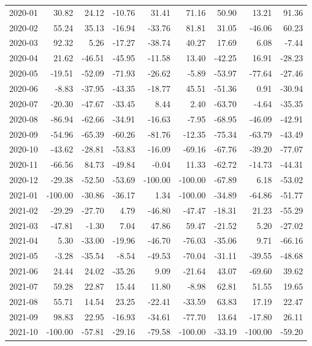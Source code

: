 \begin{table}[ht]
\begin{tabular}{lrrrrrrrr}
  2020-01 & 30.82 & 24.12 & -10.76 & 31.41 & 71.16 & 50.90 & 13.21 & 91.36 \\ 
  2020-02 & 55.24 & 35.13 & -16.94 & -33.76 & 81.81 & 31.05 & -46.06 & 60.23 \\ 
  2020-03 & 92.32 & 5.26 & -17.27 & -38.74 & 40.27 & 17.69 & 6.08 & -7.44 \\ 
  2020-04 & 21.62 & -46.51 & -45.95 & -11.58 & 13.40 & -42.25 & 16.91 & -28.23 \\ 
  2020-05 & -19.51 & -52.09 & -71.93 & -26.62 & -5.89 & -53.97 & -77.64 & -27.46 \\ 
  2020-06 & -8.83 & -37.95 & -43.35 & -18.77 & 45.51 & -51.36 & 0.91 & -30.94 \\ 
  2020-07 & -20.30 & -47.67 & -33.45 & 8.44 & 2.40 & -63.70 & -4.64 & -35.35 \\ 
  2020-08 & -86.94 & -62.66 & -34.91 & -16.63 & -7.95 & -68.95 & -46.09 & -42.91 \\ 
  2020-09 & -54.96 & -65.39 & -60.26 & -81.76 & -12.35 & -75.34 & -63.79 & -43.49 \\ 
  2020-10 & -43.62 & -28.81 & -53.83 & -16.09 & -69.16 & -67.76 & -39.20 & -77.07 \\ 
  2020-11 & -66.56 & 84.73 & -49.84 & -0.04 & 11.33 & -62.72 & -14.73 & -44.31 \\ 
  2020-12 & -29.38 & -52.50 & -53.69 & -100.00 & -100.00 & -67.89 & 6.18 & -53.02 \\ 
  2021-01 & -100.00 & -30.86 & -36.17 & 1.34 & -100.00 & -34.89 & -64.86 & -51.77 \\ 
  2021-02 & -29.29 & -27.70 & 4.79 & -46.80 & -47.47 & -18.31 & 21.23 & -55.29 \\ 
  2021-03 & -47.81 & -1.30 & 7.04 & 47.86 & 59.47 & -21.52 & 5.20 & -27.02 \\ 
  2021-04 & 5.30 & -33.00 & -19.96 & -46.70 & -76.03 & -35.06 & 9.71 & -66.16 \\ 
  2021-05 & -3.28 & -35.54 & -8.54 & -49.53 & -70.04 & -31.11 & -39.55 & -48.68 \\ 
  2021-06 & 24.44 & 24.02 & -35.26 & 9.09 & -21.64 & 43.07 & -69.60 & 39.62 \\ 
  2021-07 & 59.28 & 22.87 & 15.44 & 11.80 & -8.98 & 62.81 & 51.55 & 19.65 \\ 
  2021-08 & 55.71 & 14.54 & 23.25 & -22.41 & -33.59 & 63.83 & 17.19 & 22.47 \\ 
  2021-09 & 98.83 & 22.95 & -16.93 & -34.61 & -77.70 & 13.64 & -17.80 & 26.11 \\ 
  2021-10 & -100.00 & -57.81 & -29.16 & -79.58 & -100.00 & -33.19 & -100.00 & -59.20 \\ 

\end{tabular}
\end{table}
